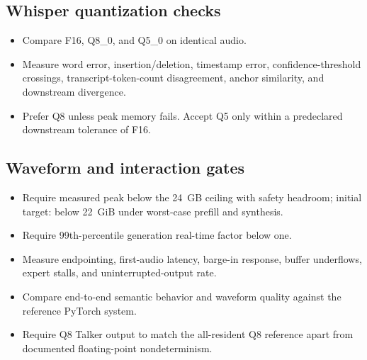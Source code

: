 \documentclass[10pt,letterpaper]{article}
\begin{document}
\subsection{Whisper quantization checks}
\begin{itemize}
    \item Compare F16, Q8\_0, and Q5\_0 on identical audio.
    \item Measure word error, insertion/deletion, timestamp error, confidence-threshold crossings, transcript-token-count disagreement, anchor similarity, and downstream divergence.
    \item Prefer Q8 unless peak memory fails. Accept Q5 only within a predeclared downstream tolerance of F16.
\end{itemize}

\subsection{Waveform and interaction gates}
\begin{itemize}
    \item Require measured peak below the 24~GB ceiling with safety headroom; initial target: below 22~GiB under worst-case prefill and synthesis.
    \item Require 99th-percentile generation real-time factor below one.
    \item Measure endpointing, first-audio latency, barge-in response, buffer underflows, expert stalls, and uninterrupted-output rate.
    \item Compare end-to-end semantic behavior and waveform quality against the reference PyTorch system.
    \item Require Q8 Talker output to match the all-resident Q8 reference apart from documented floating-point nondeterminism.
\end{itemize}
\end{document}

